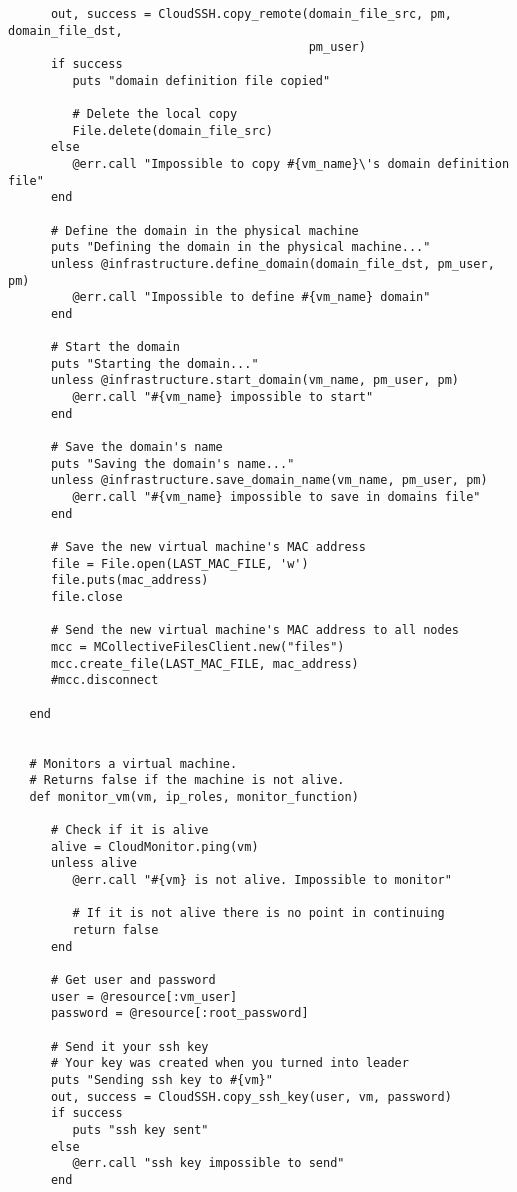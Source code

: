 \begin{lstlisting}
      out, success = CloudSSH.copy_remote(domain_file_src, pm, domain_file_dst,
                                          pm_user)
      if success
         puts "domain definition file copied"
         
         # Delete the local copy
         File.delete(domain_file_src)
      else
         @err.call "Impossible to copy #{vm_name}\'s domain definition file"
      end
      
      # Define the domain in the physical machine
      puts "Defining the domain in the physical machine..."
      unless @infrastructure.define_domain(domain_file_dst, pm_user, pm)
         @err.call "Impossible to define #{vm_name} domain"
      end
      
      # Start the domain
      puts "Starting the domain..."
      unless @infrastructure.start_domain(vm_name, pm_user, pm)
         @err.call "#{vm_name} impossible to start"
      end
      
      # Save the domain's name
      puts "Saving the domain's name..."
      unless @infrastructure.save_domain_name(vm_name, pm_user, pm)
         @err.call "#{vm_name} impossible to save in domains file"
      end

      # Save the new virtual machine's MAC address
      file = File.open(LAST_MAC_FILE, 'w')
      file.puts(mac_address)
      file.close
      
      # Send the new virtual machine's MAC address to all nodes
      mcc = MCollectiveFilesClient.new("files")
      mcc.create_file(LAST_MAC_FILE, mac_address)
      #mcc.disconnect

   end


   # Monitors a virtual machine.
   # Returns false if the machine is not alive.
   def monitor_vm(vm, ip_roles, monitor_function)

      # Check if it is alive
      alive = CloudMonitor.ping(vm)
      unless alive
         @err.call "#{vm} is not alive. Impossible to monitor"
         
         # If it is not alive there is no point in continuing
         return false
      end
      
      # Get user and password
      user = @resource[:vm_user]
      password = @resource[:root_password]
      
      # Send it your ssh key
      # Your key was created when you turned into leader
      puts "Sending ssh key to #{vm}"
      out, success = CloudSSH.copy_ssh_key(user, vm, password)
      if success
         puts "ssh key sent"
      else
         @err.call "ssh key impossible to send"
      end
      

\end{lstlisting}
